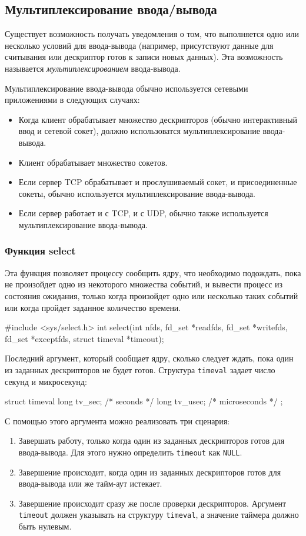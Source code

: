 \subsection{Мультиплексирование ввода/вывода}
Существует возможность получать уведомления о том, что выполняется одно или несколько условий для ввода-вывода (например, присутствуют данные для считывания или дескриптор готов к записи новых данных). Эта возможность называется \emph{мультиплексированием} ввода-вывода.

Мультиплексирование ввода-вывода обычно используется сетевыми приложениями в следующих случаях:
\begin{itemize}
  \item Когда клиент обрабатывает множество дескрипторов (обычно интерактивный ввод и сетевой сокет), должно использоватся мультиплексирование ввода-вывода.
  \item Клиент обрабатывает множество сокетов.
  \item Если сервер TCP обрабатывает и прослушиваемый сокет, и присоединенные сокеты, обычно используется мультиплексирование ввода-вывода.
  \item Если сервер работает и с TCP, и с UDP, обычно также используется мультиплексирование ввода-вывода.
\end{itemize}

\subsubsection{Функция select}
Эта функция позволяет процессу сообщить ядру, что необходимо подождать, пока не произойдет одно из некоторого множества событий, и вывести процесс из состояния ожидания, только когда произойдет одно или несколько таких событий или когда пройдет заданное количество времени.

\begin{clst}{}{}
#include <sys/select.h>
int select(int nfds, fd_set *readfds, fd_set *writefds,
           fd_set *exceptfds, struct timeval *timeout);
\end{clst}

Последний аргумент, который сообщает ядру, сколько следует ждать, пока один из заданных дескрипторов не будет готов. Структура \lstinline{timeval} задает число секунд и микросекунд:
\begin{clst}{}{}
struct timeval {
    long tv_sec;   /* seconds */
    long tv_usec;  /* microseconds */
};
\end{clst}

С помощью этого аргумента можно реализовать три сценария:
\begin{enumerate}
  \item Завершать работу, только когда один из заданных дескрипторов готов для ввода-вывода. Для этого нужно определить \lstinline{timeout} как \lstinline{NULL}.
  \item Завершение происходит, когда один из заданных дескрипторов готов для ввода-вывода или же тайм-аут истекает.
  \item Завершение происходит сразу же после проверки дескрипторов. Аргумент \lstinline{timeout} должен указывать на структуру \lstinline{timeval}, а значение таймера должно быть нулевым.
\end{enumerate}

